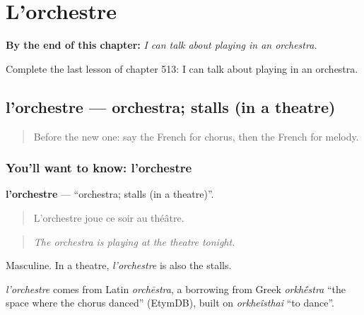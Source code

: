 
\chapter{L'orchestre}
\label{ch:fr-l-orchestre}

\begin{chapteropening}
\textbf{By the end of this chapter:} \emph{I can talk about playing in an orchestra.}

Complete the last lesson of chapter 513: I can talk about playing in an orchestra.
\end{chapteropening}

\section[l'orchestre]{l'orchestre — orchestra; stalls (in a theatre)}

\label{lesson:FR-C513-orchestre}



\begin{quote}
Before the new one: say the French for chorus, then the French for melody.
\end{quote}

\subsection*{You'll want to know: l'orchestre}
\textbf{l'orchestre} — \textquotedblleft{}orchestra; stalls (in a theatre)\textquotedblright{}.

\begin{quote}
L'orchestre joue ce soir au théâtre.
\end{quote}

\begin{quote}
\emph{The orchestra is playing at the theatre tonight.}
\end{quote}

Masculine. In a theatre, \emph{l'orchestre} is also the stalls.

\begin{cousinweb}
\emph{l'orchestre} comes from Latin \emph{orchēstra}, a borrowing from Greek \emph{orkh\'{\={e}}stra} \textquotedblleft{}the space where the chorus danced\textquotedblright{} (EtymDB), built on \emph{orkheîsthai} \textquotedblleft{}to dance\textquotedblright{}.
\end{cousinweb}

